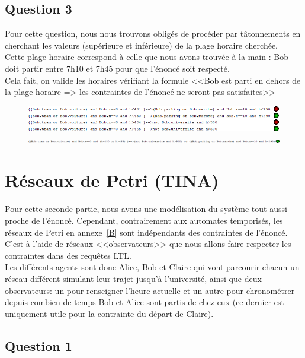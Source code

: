 \documentclass[11pt, a4paper]{article} %
\begin{document}
\subsection{Question 3}
\label{sub:UPPAALQ3}
Pour cette question, nous nous trouvons obligés de procéder par tâtonnements en cherchant les valeurs (supérieure et inférieure) de la plage horaire cherchée.\\
Cette plage horaire correspond à celle que nous avons trouvée à la main : Bob doit partir entre 7h10 et 7h45 pour que l'énoncé soit respecté.\\
Cela fait, on valide les horaires vérifiant la formule <<Bob est parti en dehors de la plage horaire => les contraintes de l'énoncé ne seront pas satisfaites>>

\begin{figure}[h]
    \begin{flushleft}
      \includegraphics[scale=0.60]{captures/uppaalQ3.png}
      \includegraphics[scale=0.50]{captures/uppaalQ3bis.png}
    \end{flushleft}
\end{figure}

\clearpage

\section{Réseaux de Petri (TINA)}
\label{sec:TINA}
Pour cette seconde partie, nous avons une modélisation du système tout aussi proche de l'énoncé. Cependant, contrairement aux automates temporisés, les réseaux de Petri en annexe~\ref{B} sont indépendants des contraintes de l'énoncé. C'est à l'aide de réseaux <<observateurs>> que nous allons faire respecter les contraintes dans des requêtes LTL.\\
Les différents agents sont donc Alice, Bob et Claire qui vont parcourir chacun un réseau différent simulant leur trajet jusqu'à l'université, ainsi que deux observateurs: un pour renseigner l'heure actuelle et un autre pour chronométrer depuis combien de temps Bob et Alice sont partis de chez eux (ce dernier est uniquement utile pour la contrainte du départ de Claire).

\subsection{Question 1}
\label{sub:TINAQ1}
\end{document}
